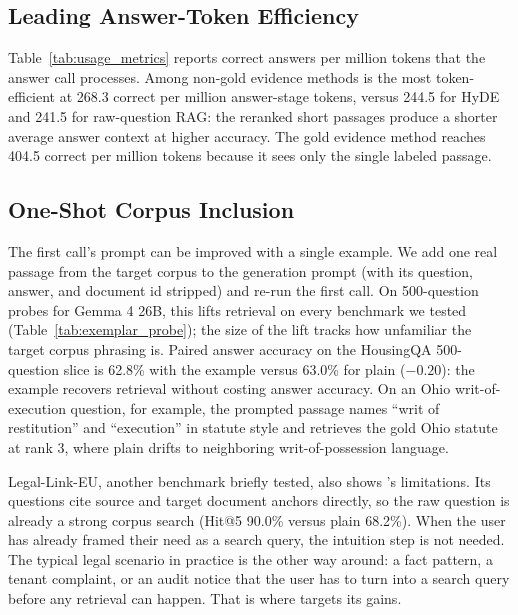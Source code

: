 \subsection{Leading Answer-Token Efficiency}

Table~\ref{tab:usage_metrics} reports correct answers per million tokens
that the answer call processes. Among non-gold evidence methods \hyre{} is the
most token-efficient at 268.3 correct per million answer-stage tokens,
versus 244.5 for HyDE and 241.5 for raw-question RAG: the reranked short
passages produce a shorter average answer context at higher accuracy. The
gold evidence method reaches 404.5 correct per million tokens because it
sees only the single labeled passage.

\subsection{One-Shot Corpus Inclusion}\label{subsec:housing_promising}



The first call's prompt can be improved with a single example. We add one
real passage from the target corpus to the \hyre{} generation prompt (with
its question, answer, and document id stripped) and re-run the first call.
On 500-question probes for Gemma 4 26B, this lifts retrieval on every
benchmark we tested (Table~\ref{tab:exemplar_probe}); the size of the lift
tracks how unfamiliar the target corpus phrasing is. Paired answer accuracy
on the HousingQA 500-question slice is 62.8\% with the example versus
63.0\% for plain \hyre{} ($-0.20$\pp{}): the example recovers retrieval
without costing answer accuracy. On an Ohio writ-of-execution question,
for example, the prompted passage names ``writ of restitution'' and
``execution'' in statute style and retrieves the gold Ohio statute at rank
3, where plain \hyre{} drifts to neighboring writ-of-possession language.

Legal-Link-EU, another benchmark briefly tested, also shows \hyre{}'s limitations. Its questions
cite source and target document anchors directly, so the raw question is
already a strong corpus search (Hit@5 90.0\% versus plain \hyre{} 68.2\%).
When the user has already framed their need as a search query, the
intuition step is not needed. The typical legal scenario in practice is
the other way around: a fact pattern, a tenant complaint, or an audit
notice that the user has to turn into a search query before any retrieval
can happen. That is where \hyre{} targets its gains.
